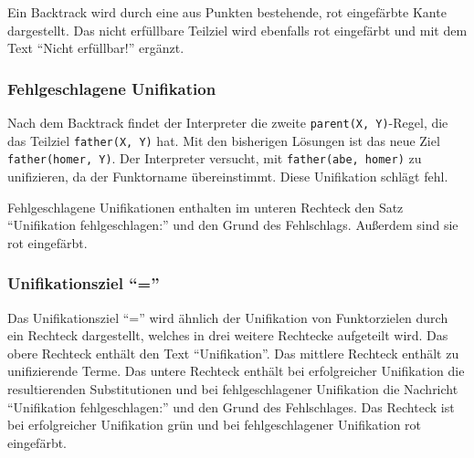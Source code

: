 \documentclass[parskip=full,11pt,twoside]{scrartcl}
\begin{document}
\begin{minipage}{\linewidth}
\end{minipage}

Ein Backtrack wird durch eine aus Punkten bestehende, rot eingefärbte Kante dargestellt.
Das nicht erfüllbare Teilziel wird ebenfalls rot eingefärbt und mit dem Text \enquote{Nicht erfüllbar!} ergänzt.

\subsubsection{Fehlgeschlagene Unifikation}

Nach dem Backtrack findet der Interpreter die zweite \texttt{parent(X, Y)}-Regel, die das Teilziel \texttt{father(X, Y)} hat.
Mit den bisherigen Lösungen ist das neue Ziel \texttt{father(homer, Y)}.
Der Interpreter versucht, mit \texttt{father(abe, homer)} zu unifizieren, da der Funktorname übereinstimmt.
Diese Unifikation schlägt fehl.

\begin{minipage}{\linewidth}
\end{minipage}

Fehlgeschlagene Unifikationen enthalten im unteren Rechteck den Satz \enquote{Unifikation fehlgeschlagen:} und den Grund des Fehlschlags.
Außerdem sind sie rot eingefärbt.

\subsubsection{Unifikationsziel \enquote{=}}

Das Unifikationsziel \enquote{=} wird ähnlich der Unifikation von Funktorzielen durch ein Rechteck dargestellt, welches in drei weitere Rechtecke aufgeteilt wird.
Das obere Rechteck enthält den Text \enquote{Unifikation}.
Das mittlere Rechteck enthält zu unifizierende Terme.
Das untere Rechteck enthält bei erfolgreicher Unifikation die resultierenden Substitutionen und bei fehlgeschlagener Unifikation die Nachricht \enquote{Unifikation fehlgeschlagen:} und den Grund des Fehlschlages.
Das Rechteck ist bei erfolgreicher Unifikation grün und bei fehlgeschlagener Unifikation rot eingefärbt.
\end{document}
